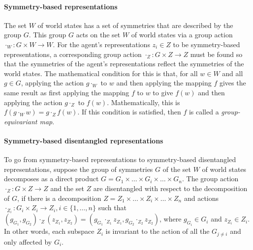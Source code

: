 \paragraph{Symmetry-based representations}
The set $W$ of world states has a set of symmetries that are described by the group $G$.
This group $G$ acts on the set $W$ of world states via a group action $\cdot_{W}: G \times W \to W$.
For the agent's representations $z_i \in Z$ to be symmetry-based representations, a corresponding group action $\cdot_{Z}: G \times Z \to Z$ must be found so that the symmetries of the agent's representations reflect the symmetries of the world states.
The mathematical condition for this is that, for all $w \in W$ and all $g \in G$, applying the action $g \cdot_W$ to $w$ and then applying the mapping $f$ gives the same result as first applying the mapping $f$ to $w$ to give $f(w)$ and then applying the action $g \cdot_Z$ to $f(w)$.
Mathematically, this is $f(g \cdot_W w) = g \cdot_Z f(w)$.
If this condition is satisfied, then $f$ is called a \textit{group-equivariant map}.

\paragraph{Symmetry-based disentangled representations}
To go from symmetry-based representations to symmetry-based disentangled representations, suppose the group of symmetries $G$ of the set $W$ of world states decomposes as a direct product $G = G_1 \times \hdots \times G_i \times \hdots \times G_n$.
The group action $\cdot_Z : G \times Z \to Z$ and the set $Z$ are disentangled with respect to the decomposition of $G$, if there is a decomposition $Z = Z_1 \times \hdots \times Z_i \times \hdots \times Z_n$ and actions $\cdot_{Z_i}: G_i \times Z_i \to Z_i, i \in \{1, \hdots, n\}$ such that $(g_{G_1}, g_{G_2}) \cdot_Z (z_{Z_1}, z_{Z_2}) = (g_{G_1} \cdot_{Z_1} z_{Z_1}, g_{G_2} \cdot_{Z_2} z_{Z_2})$, where $g_{G_i} \in G_i$ and $z_{Z_i} \in Z_i$.
In other words, each subspace $Z_i$ is invariant to the action of all the $G_{j \neq i}$ and only affected by $G_i$.

